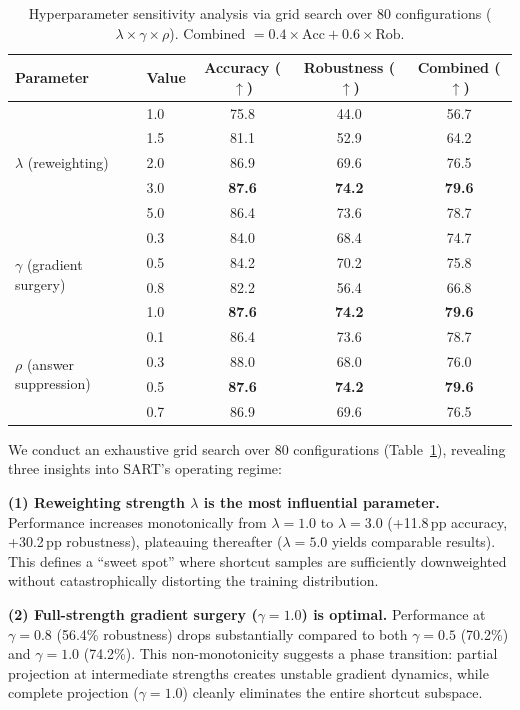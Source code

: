 \begin{table}[t]
\centering
\caption{Hyperparameter sensitivity analysis via grid search over 80 configurations ($\lambda {\times} \gamma {\times} \rho$). Combined $= 0.4 {\times} \text{Acc} + 0.6 {\times} \text{Rob}$.}
\label{tab:sensitivity}
\small
\begin{tabular}{llccc}
\toprule
\textbf{Parameter} & \textbf{Value} & \textbf{Accuracy} ($\uparrow$) & \textbf{Robustness} ($\uparrow$) & \textbf{Combined} ($\uparrow$) \\
\midrule
\multirow{5}{*}{$\lambda$ (reweighting)}
    & 1.0 & 75.8 & 44.0 & 56.7 \\
    & 1.5 & 81.1 & 52.9 & 64.2 \\
    & 2.0 & 86.9 & 69.6 & 76.5 \\
    & 3.0 & \textbf{87.6} & \textbf{74.2} & \textbf{79.6} \\
    & 5.0 & 86.4 & 73.6 & 78.7 \\
\midrule
\multirow{4}{*}{$\gamma$ (gradient surgery)}
    & 0.3 & 84.0 & 68.4 & 74.7 \\
    & 0.5 & 84.2 & 70.2 & 75.8 \\
    & 0.8 & 82.2 & 56.4 & 66.8 \\
    & 1.0 & \textbf{87.6} & \textbf{74.2} & \textbf{79.6} \\
\midrule
\multirow{4}{*}{$\rho$ (answer suppression)}
    & 0.1 & 86.4 & 73.6 & 78.7 \\
    & 0.3 & 88.0 & 68.0 & 76.0 \\
    & 0.5 & \textbf{87.6} & \textbf{74.2} & \textbf{79.6} \\
    & 0.7 & 86.9 & 69.6 & 76.5 \\
\bottomrule
\end{tabular}
\end{table}

We conduct an exhaustive grid search over 80 configurations (Table~\ref{tab:sensitivity}), revealing three insights into SART's operating regime:

\textbf{(1) Reweighting strength $\lambda$ is the most influential parameter.} Performance increases monotonically from $\lambda{=}1.0$ to $\lambda{=}3.0$ (+11.8\,pp accuracy, +30.2\,pp robustness), plateauing thereafter ($\lambda{=}5.0$ yields comparable results). This defines a ``sweet spot'' where shortcut samples are sufficiently downweighted without catastrophically distorting the training distribution.

\textbf{(2) Full-strength gradient surgery ($\gamma{=}1.0$) is optimal.} Performance at $\gamma{=}0.8$ (56.4\% robustness) drops substantially compared to both $\gamma{=}0.5$ (70.2\%) and $\gamma{=}1.0$ (74.2\%). This non-monotonicity suggests a phase transition: partial projection at intermediate strengths creates unstable gradient dynamics, while complete projection ($\gamma{=}1.0$) cleanly eliminates the entire shortcut subspace.


